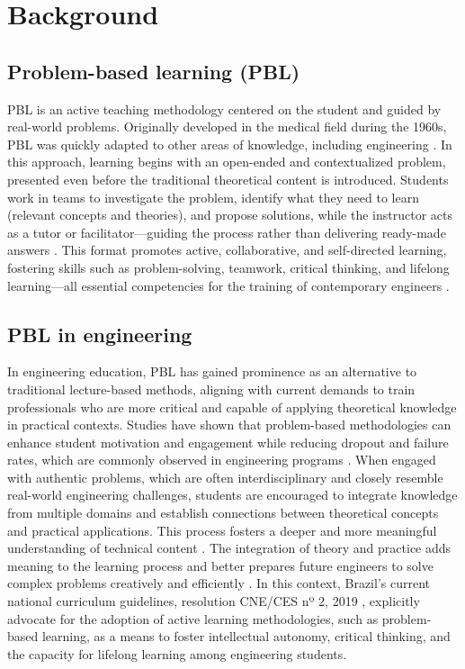 \documentclass[english]{textolivre}
\begin{document}
\section{Background}

\subsection{Problem-based learning (PBL)}
PBL is an active teaching methodology centered on the student and guided by real-world problems. Originally developed in the medical field during the 1960s, PBL was quickly adapted to other areas of knowledge, including engineering \cite{barrows1980problem}. In this approach, learning begins with an open-ended and contextualized problem, presented even before the traditional theoretical content is introduced. Students work in teams to investigate the problem, identify what they need to learn (relevant concepts and theories), and propose solutions, while the instructor acts as a tutor or facilitator—guiding the process rather than delivering ready-made answers \cite{barrows1996problem}. This format promotes active, collaborative, and self-directed learning, fostering skills such as problem-solving, teamwork, critical thinking, and lifelong learning—all essential competencies for the training of contemporary engineers \cite{albanese1993problem,savery1995problem}.

\subsection{PBL in engineering}
In engineering education, PBL has gained prominence as an alternative to traditional lecture-based methods, aligning with current demands to train professionals who are more critical and capable of applying theoretical knowledge in practical contexts. Studies have shown that problem-based methodologies can enhance student motivation and engagement while reducing dropout and failure rates, which are commonly observed in engineering programs \cite{prince2006inductive, ribeiro2022aprendizagem}. When engaged with authentic problems, which are often interdisciplinary and closely resemble real-world engineering challenges, students are encouraged to integrate knowledge from multiple domains and establish connections between theoretical concepts and practical applications. This process fosters a deeper and more meaningful understanding of technical content \cite{ribeiro2022aprendizagem}. The integration of theory and practice adds meaning to the learning process and better prepares future engineers to solve complex problems creatively and efficiently \cite{berbel1998problematizaccao,prince2006inductive}. In this context, Brazil’s current national curriculum guidelines, resolution CNE/CES nº 2, 2019 \cite{brasil2019dcnsengenharia}, explicitly advocate for the adoption of active learning methodologies, such as problem-based learning, as a means to foster intellectual autonomy, critical thinking, and the capacity for lifelong learning among engineering students.
\end{document}
